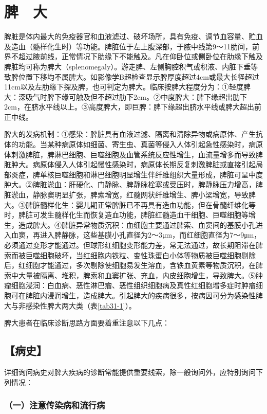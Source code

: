 \chapter{脾　大}

脾脏是体内最大的免疫器官和血液滤过、破坏场所，具有免疫、调节血容量、贮血及造血（髓样化生时）等功能。脾脏位于左上腹深部，于腋中线第9～11肋间，前界不超过腋前线，正常情况下肋缘下不能触及。凡在仰卧位或侧卧位在肋缘下触及脾脏均可称为脾大（splenomegaly）。游走脾、左侧胸腔积气或积液、内脏下垂等致脾位置下移均不属脾大。如影像学B超检查显示脾厚度超过4cm或最大长径超过11cm以及左肋缘下探及脾，也可判定为脾大。临床按脾大程度分为：①轻度脾大：深吸气时脾下缘可触及但不超过肋下2cm。②中度脾大：脾下缘超出肋下2cm，在脐水平线以上。③高度脾大，即巨脾：脾下缘超出脐水平线或脾大超出前正中线。

脾大的发病机制：①感染：脾脏具有血液过滤、隔离和清除异物或病原体、产生抗体的功能。当某种病原体如细菌、寄生虫、真菌等侵入人体引起急性感染时，病原体刺激脾脏，脾淋巴细胞、巨噬细胞及血管系统反应性增生，血流量增多而导致脾脏肿大。病原体侵入人体引起慢性感染时，病原体长期反复刺激脾脏或直接引起局部炎症，脾单核巨噬细胞和淋巴细胞明显增生伴纤维组织大量形成，脾脏可呈中度肿大。②脾脏淤血：肝硬化、门静脉、脾静脉栓塞或受压时，脾静脉压力增高，脾脏淤血，静脉窦明显扩张，脾索增宽，红髓网状纤维增生、脾小梁增宽，导致脾大。③脾脏髓样化生：婴儿期正常脾脏已不再具有造血功能，但在骨髓纤维化等时，脾脏可发生髓样化生而恢复造血功能，脾脏红髓造血干细胞、巨噬细胞等增生，造成脾大。④脾脏异常物质沉积：血细胞主要通过脾索、血窦间的基膜小孔进入血窦，再进入脾静脉，这些基膜小孔直径为2～3μm，而红细胞直径为7～9μm，必须通过变形才能通过。但球形红细胞变形能力差，常无法通过，故长期阻滞在脾索而被巨噬细胞破坏，当红细胞内铁粒、变性珠蛋白小体等物质被巨噬细胞剔除后，红细胞才能通过，多次剔除使细胞易发生溶血，含铁血黄素等物质沉积，在脾索中大量被隔离、堆积，脾索和血窦扩张、充血，内皮细胞增生，导致脾大。⑤肿瘤细胞浸润：白血病、恶性淋巴瘤、恶性组织细胞病及真性红细胞增多症时肿瘤细胞可在脾脏内浸润增生，造成脾大。引起脾大的疾病很多，按病因可分为感染性脾大与非感染性脾大两大类（表\ref{tab31-1}）。

脾大患者在临床诊断思路方面要着重注意以下几点：

\section{【病史】}

详细询问病史对脾大疾病的诊断常能提供重要线索，除一般询问外，应特别询问下列情况：

\subsection{（一）注意传染病和流行病}

